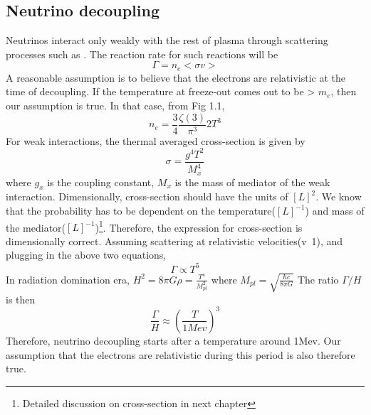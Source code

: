 \documentclass[12pt,a4paper,oneside]{book}
\begin{document}
\subsection{Neutrino decoupling}
Neutrinos interact only weakly with the rest of plasma through scattering processes such as  . The reaction rate for such reactions will be
\begin{equation}
    \Gamma  = n_{e}<\sigma v>  
\end{equation}
A reasonable assumption is to believe that the electrons are relativistic at the time of decoupling. If the temperature at freeze-out comes out to be > $m_{e}$, then our assumption is true. In that case, from Fig 1.1,
\begin{equation}
    n_{e} = \frac{3}{4}\frac{\zeta(3)}{\pi^3} 2 T^3 
\end{equation}
For weak interactions, the thermal averaged cross-section is given by
\begin{equation}
    \sigma  = \frac{g^4T^2}{M_{x}^{4}}
\end{equation}
where $g_{x}$ is the coupling constant, $M_{x}$ is the mass of mediator of the weak interaction. Dimensionally, cross-section should have the units of $[L]^{2}$. We know that the probability has to be dependent on the temperature($[L]^{-1}$) and mass of the mediator($[L]^{-1}$)\footnote{Detailed discussion on cross-section in next chapter}. Therefore, the expression for cross-section is dimensionally correct. Assuming scattering at relativistic velocities(v~1), and plugging in the above two equations, 
\begin{equation}
    \Gamma \propto T^5
\end{equation}
In radiation domination era, $ H^2 = 8\pi G\rho = \frac{T^4}{M_{pl}^{2}}$ where $M_{pl} = \sqrt{\frac{\hbar c}{8\pi G}}$  
\newline The ratio $\Gamma/ H$ is then 
\begin{equation}
    \frac{\Gamma}{H} \approx (\frac{T}{1Mev})^{3}
\end{equation}
Therefore, neutrino decoupling starts after a temperature around 1Mev. Our assumption that the electrons are relativistic during this period is also therefore true. 
\end{document}
